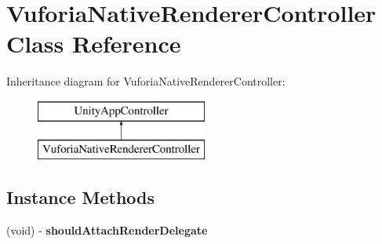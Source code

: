 \hypertarget{interface_vuforia_native_renderer_controller}{}\section{Vuforia\+Native\+Renderer\+Controller Class Reference}
\label{interface_vuforia_native_renderer_controller}
Inheritance diagram for Vuforia\+Native\+Renderer\+Controller\+:\begin{figure}[H]
\begin{center}
\leavevmode
\includegraphics[height=2.000000cm]{interface_vuforia_native_renderer_controller}
\end{center}
\end{figure}
\subsection*{Instance Methods}
\begin{DoxyCompactItemize}
\item 
\hypertarget{interface_vuforia_native_renderer_controller_aa6a2d730b193975eb6729b392157eb06}{}(void) -\/ {\bfseries should\+Attach\+Render\+Delegate}\label{interface_vuforia_native_renderer_controller_aa6a2d730b193975eb6729b392157eb06}

\end{DoxyCompactItemize}
